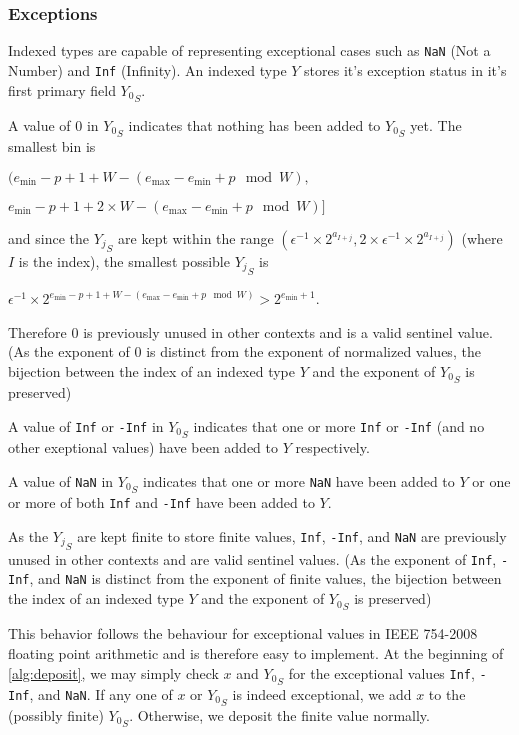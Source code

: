 \documentclass[12pt]{article}
\providecommand{\min}{\ensuremath{\text{min}}}
\providecommand{\max}{\ensuremath{\text{max}}}
\theoremstyle{plain}
\begin{document}
    \subsubsection{Exceptions}
      Indexed types are capable of representing exceptional cases such as \verb|NaN| (Not a Number) and \verb|Inf| (Infinity). An indexed type $Y$ stores it's exception status in it's first primary field ${Y_0}_S$.

      A value of $0$ in ${Y_0}_S$ indicates that nothing has been added to ${Y_0}_S$ yet. The smallest bin is

      $(e_{\min} - p + 1 + W - (e_{\max} - e_{\min} + p \mod W),$

      \indent \indent $e_{\min} - p + 1 + 2 \times W - (e_{\max} - e_{\min} + p \mod W)]$

      and since the ${Y_j}_S$ are kept within the range $(\epsilon^{-1} \times 2^{a_{I + j}}, 2 \times \epsilon^{-1} \times 2^{a_{I + j}})$ (where $I$ is the index), the smallest possible ${Y_j}_S$ is

      $\epsilon^{-1} \times 2^{e_{\min} - p + 1 + W - (e_{\max} - e_{\min} + p \mod W)} > 2^{e_{\min} + 1}$.

      Therefore $0$ is previously unused in other contexts and is a valid sentinel value. (As the exponent of $0$ is distinct from the exponent of normalized values, the bijection between the index of an indexed type $Y$ and the exponent of ${Y_0}_S$ is preserved)

      A value of \verb|Inf| or \verb|-Inf| in ${Y_0}_S$ indicates that one or more \verb|Inf| or \verb|-Inf| (and no other exeptional values) have been added to $Y$ respectively.

      A value of \verb|NaN| in ${Y_0}_S$ indicates that one or more \verb|NaN| have been added to $Y$ or one or more of both \verb|Inf| and \verb|-Inf| have been added to $Y$.

      As the ${Y_j}_S$ are kept finite to store finite values, \verb|Inf|, \verb|-Inf|, and \verb|NaN| are previously unused in other contexts and are valid sentinel values. (As the exponent of \verb|Inf|, \verb|-Inf|, and \verb|NaN| is distinct from the exponent of finite values, the bijection between the index of an indexed type $Y$ and the exponent of ${Y_0}_S$ is preserved)

      This behavior follows the behaviour for exceptional values in IEEE 754-2008 floating point arithmetic and is therefore easy to implement. At the beginning of \ref{alg:deposit}, we may simply check $x$ and ${Y_0}_S$ for the exceptional values \verb|Inf|, \verb|-Inf|, and \verb|NaN|. If any one of $x$ or ${Y_0}_S$ is indeed exceptional, we add $x$ to the (possibly finite) ${Y_0}_S$. Otherwise, we deposit the finite value normally.
\end{document}
